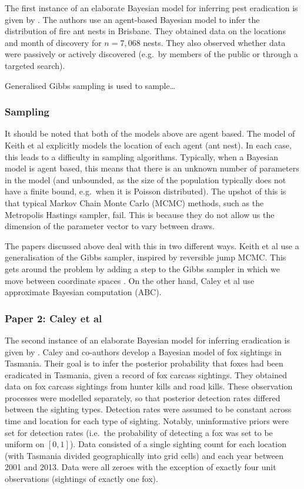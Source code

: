 \documentclass[
]{book}
\begin{document}
The first instance of an elaborate Bayesian model for inferring pest eradication is given by \citet{keith2013}. The authors use an agent-based Bayesian model to infer the distribution of fire ant nests in Brisbane. They obtained data on the locations and month of discovery for \(n = 7{,}068\) nests. They also observed whether data were passively or actively discovered (e.g.~by members of the public or through a targeted search).

Generalised Gibbs sampling is used to sample\ldots{}

\hypertarget{sampling}{%
\subsubsection{Sampling}\label{sampling}}

It should be noted that both of the models above are agent based. The model of Keith et al explicitly models the location of each agent (ant nest). In each case, this leads to a difficulty in sampling algorithms. Typically, when a Bayesian model is agent based, this means that there is an unknown number of parameters in the model (and unbounded, as the size of the population typically does not have a finite bound, e.g.~when it is Poisson distributed). The upshot of this is that typical Markov Chain Monte Carlo (MCMC) methods, such as the Metropolis Hastings sampler, fail. This is because they do not allow us the dimension of the parameter vector to vary between draws.

The papers discussed above deal with this in two different ways. Keith et al use a generalisation of the Gibbs sampler, inspired by reversible jump MCMC. This gets around the problem by adding a step to the Gibbs sampler in which we move between coordinate spaces . On the other hand, Caley et al use approximate Bayesian computation (ABC).

\hypertarget{paper-2-caley-et-al}{%
\subsubsection{Paper 2: Caley et al}\label{paper-2-caley-et-al}}

The second instance of an elaborate Bayesian model for inferring eradication is given by \citet{caley2015}. Caley and co-authors develop a Bayesian model of fox sightings in Tasmania. Their goal is to infer the posterior probability that foxes had been eradicated in Tasmania, given a record of fox carcass sightings. They obtained data on fox carcass sightings from hunter kills and road kills. These observation processes were modelled separately, so that posterior detection rates differed between the sighting types. Detection rates were assumed to be constant across time and location for each type of sighting. Notably, uninformative priors were set for detection rates (i.e.~the probability of detecting a fox was set to be uniform on \([0, 1]\)). Data consisted of a single sighting count for each location (with Tasmania divided geographically into grid cells) and each year between 2001 and 2013. Data were all zeroes with the exception of exactly four unit observations (sightings of exactly one fox).
\end{document}

